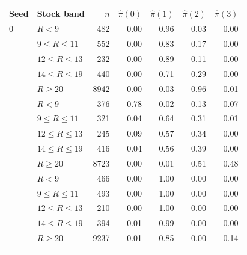\begin{tabular}{llrrrrr}
\toprule
Seed & Stock band & $n$ & $\hat\pi(0)$ & $\hat\pi(1)$ & $\hat\pi(2)$ & $\hat\pi(3)$ \\
\midrule
0 & $R<9$ & 482 & 0.00 & 0.96 & 0.03 & 0.00 \\
 & $9\le R\le 11$ & 552 & 0.00 & 0.83 & 0.17 & 0.00 \\
 & $12\le R\le 13$ & 232 & 0.00 & 0.89 & 0.11 & 0.00 \\
 & $14\le R\le 19$ & 440 & 0.00 & 0.71 & 0.29 & 0.00 \\
 & $R\ge 20$ & 8942 & 0.00 & 0.03 & 0.96 & 0.01 \\
\addlinespace
1 & $R<9$ & 376 & 0.78 & 0.02 & 0.13 & 0.07 \\
 & $9\le R\le 11$ & 321 & 0.04 & 0.64 & 0.31 & 0.01 \\
 & $12\le R\le 13$ & 245 & 0.09 & 0.57 & 0.34 & 0.00 \\
 & $14\le R\le 19$ & 416 & 0.04 & 0.56 & 0.39 & 0.00 \\
 & $R\ge 20$ & 8723 & 0.00 & 0.01 & 0.51 & 0.48 \\
\addlinespace
2 & $R<9$ & 466 & 0.00 & 1.00 & 0.00 & 0.00 \\
 & $9\le R\le 11$ & 493 & 0.00 & 1.00 & 0.00 & 0.00 \\
 & $12\le R\le 13$ & 210 & 0.00 & 1.00 & 0.00 & 0.00 \\
 & $14\le R\le 19$ & 394 & 0.01 & 0.99 & 0.00 & 0.00 \\
 & $R\ge 20$ & 9237 & 0.01 & 0.85 & 0.00 & 0.14 \\
\addlinespace
\bottomrule
\end{tabular}
